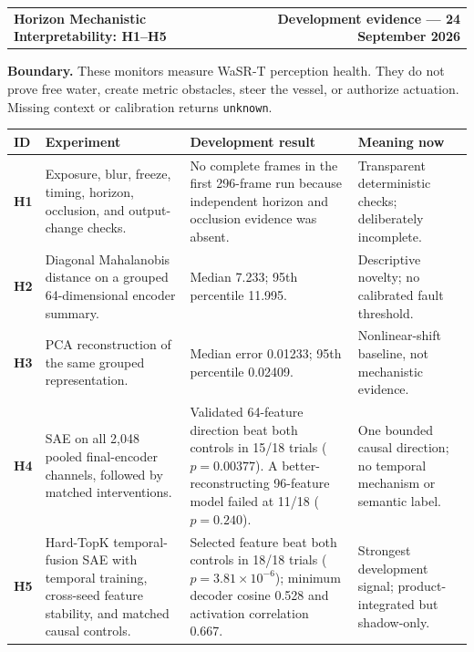 \documentclass[9pt]{article}
\begin{document}
\begin{tabularx}{\textwidth}{@{}Xr@{}}
{\Large\bfseries\color{hnavy} Horizon Mechanistic Interpretability: H1--H5} &
{\small\bfseries Development evidence --- 24 September 2026}
\end{tabularx}

\vspace{2pt}\colorbox{hpale}{\parbox{0.985\textwidth}{\small
\textbf{Boundary.} These monitors measure WaSR-T perception health. They do not
prove free water, create metric obstacles, steer the vessel, or authorize
actuation. Missing context or calibration returns \texttt{unknown}.}}

\vspace{4pt}
\begin{tabularx}{\textwidth}{@{}>{\bfseries}p{0.42in}p{2.55in}X p{1.43in}@{}}
\toprule
ID & Experiment & Development result & Meaning now \\
\midrule
H1 & Exposure, blur, freeze, timing, horizon, occlusion, and output-change checks.
& No complete frames in the first 296-frame run because independent horizon and occlusion evidence was absent.
& Transparent deterministic checks; deliberately incomplete. \\
H2 & Diagonal Mahalanobis distance on a grouped 64-dimensional encoder summary.
& Median 7.233; 95th percentile 11.995.
& Descriptive novelty; no calibrated fault threshold. \\
H3 & PCA reconstruction of the same grouped representation.
& Median error 0.01233; 95th percentile 0.02409.
& Nonlinear-shift baseline, not mechanistic evidence. \\
H4 & SAE on all 2,048 pooled final-encoder channels, followed by matched interventions.
& Validated 64-feature direction beat both controls in 15/18 trials ($p=0.00377$). A better-reconstructing 96-feature model failed at 11/18 ($p=0.240$).
& One bounded causal direction; no temporal mechanism or semantic label. \\
H5 & Hard-TopK temporal-fusion SAE with temporal training, cross-seed feature stability, and matched causal controls.
& Selected feature beat both controls in 18/18 trials ($p=3.81\times10^{-6}$); minimum decoder cosine 0.528 and activation correlation 0.667.
& Strongest development signal; product-integrated but shadow-only. \\
\bottomrule
\end{tabularx}
\end{document}
